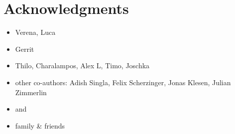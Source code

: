 



\vspace{3cm}

\begingroup
\let\clearpage\relax
\let\cleardoublepage\relax
\let\cleardoublepage\relax
\chapter*{Acknowledgments}
\begin{itemize}
    \item Verena, Luca
    \item Gerrit
    \item Thilo, Charalampos, Alex L, Timo, Joschka
    \item other co-authors: Adish Singla, Felix Scherzinger, Jonas Klesen, Julian Zimmerlin
    \item {} and 
    \item family \& friends
\end{itemize}


\endgroup
